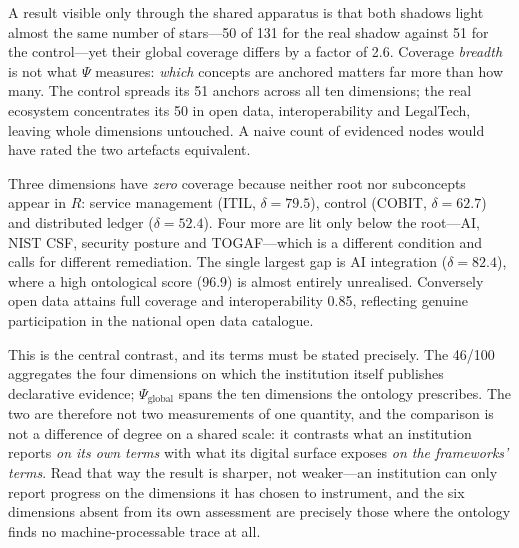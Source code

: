 \documentclass[engproc,proceedingpaper,submit,moreauthors]{Definitions/mdpi}
\begin{document}
A result visible only through the shared apparatus is that both shadows light almost the same number of stars---50 of 131 for the real shadow against 51 for the control---yet their global coverage differs by a factor of 2.6. Coverage \emph{breadth} is not what $\Psi$ measures: \emph{which} concepts are anchored matters far more than how many. The control spreads its 51 anchors across all ten dimensions; the real ecosystem concentrates its 50 in open data, interoperability and LegalTech, leaving whole dimensions untouched. A naive count of evidenced nodes would have rated the two artefacts equivalent.

Three dimensions have \emph{zero} coverage because neither root nor subconcepts appear in $R$: service management (ITIL, $\delta=79.5$), control (COBIT, $\delta=62.7$) and distributed ledger ($\delta=52.4$). Four more are lit only below the root---AI, NIST CSF, security posture and TOGAF---which is a different condition and calls for different remediation. The single largest gap is AI integration ($\delta=82.4$), where a high ontological score (96.9) is almost entirely unrealised. Conversely open data attains full coverage and interoperability 0.85, reflecting genuine participation in the national open data catalogue.

This is the central contrast, and its terms must be stated precisely. The 46/100 aggregates the four dimensions on which the institution itself publishes declarative evidence; $\Psi_{\mathrm{global}}$ spans the ten dimensions the ontology prescribes. The two are therefore not two measurements of one quantity, and the comparison is not a difference of degree on a shared scale: it contrasts what an institution reports \emph{on its own terms} with what its digital surface exposes \emph{on the frameworks' terms}. Read that way the result is sharper, not weaker---an institution can only report progress on the dimensions it has chosen to instrument, and the six dimensions absent from its own assessment are precisely those where the ontology finds no machine-processable trace at all.
\end{document}
